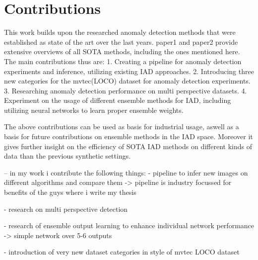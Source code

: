 \section{Contributions}
This work builds upon the researched anomaly detection methods that were established as state of the art over the last years. paper1 and paper2 provide extensive overviews of all SOTA methods,
including the ones mentioned here. The main contributions thus are:
1. Creating a pipeline for anomaly detection experiments and inference, utilizing existing IAD approaches. 
2. Introducing three new categories for the mvtec(LOCO) dataset for anomaly detection experiments.
3. Researching anomaly detection performance on multi perspective datasets.
4. Experiment on the usage of different ensemble methods for IAD, including utilizing neural networks to learn proper ensemble weights.

The above contributions can be used as basis for industrial usage, aswell as a basis for future contributions on ensemble methods in the IAD space. Moreover it gives further insight on the
efficiency of SOTA IAD methods on different kinds of data than the previous synthetic settings.



-- in my work i contribute the following things:
- pipeline to infer new images on different algorithms and compare them
-> pipeline is industry focussed for benefits of the guys where i write my thesis

- research on multi perspective detection

- research of ensemble output learning to enhance individual network performance
-> simple network over 5-6 outputs

- introduction of very new dataset categories in style of mvtec LOCO dataset


